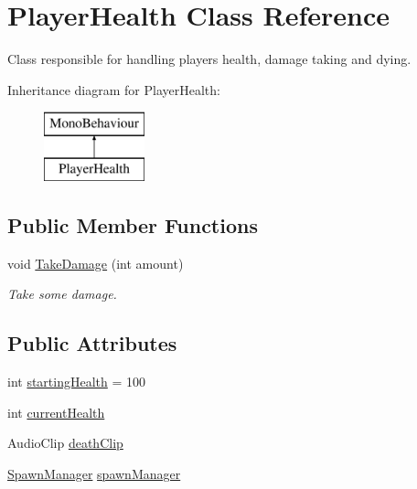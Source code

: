 \hypertarget{class_player_health}{}\section{Player\+Health Class Reference}
\label{class_player_health}


Class responsible for handling player\textquotesingle{}s health, damage taking and dying.  


Inheritance diagram for Player\+Health\+:\begin{figure}[H]
\begin{center}
\leavevmode
\includegraphics[height=2.000000cm]{class_player_health}
\end{center}
\end{figure}
\subsection*{Public Member Functions}
\begin{DoxyCompactItemize}
\item 
void \mbox{\hyperlink{class_player_health_a93c7a5b0a1baade297356b1f3341daf5}{Take\+Damage}} (int amount)
\begin{DoxyCompactList}\small\item\em Take some damage. \end{DoxyCompactList}\end{DoxyCompactItemize}
\subsection*{Public Attributes}
\begin{DoxyCompactItemize}
\item 
int \mbox{\hyperlink{class_player_health_ab688986266097903627ed2aebf0aee7b}{starting\+Health}} = 100
\item 
int \mbox{\hyperlink{class_player_health_ac824ef20d43c0489bae436f3b25c1683}{current\+Health}}
\item 
Audio\+Clip \mbox{\hyperlink{class_player_health_ae895878cc4a290e1d2786e58f5fc70b7}{death\+Clip}}
\item 
\mbox{\hyperlink{class_spawn_manager}{Spawn\+Manager}} \mbox{\hyperlink{class_player_health_af8a4d63d2e99b1cdbc93b07bf2741d9f}{spawn\+Manager}}
\end{DoxyCompactItemize}
